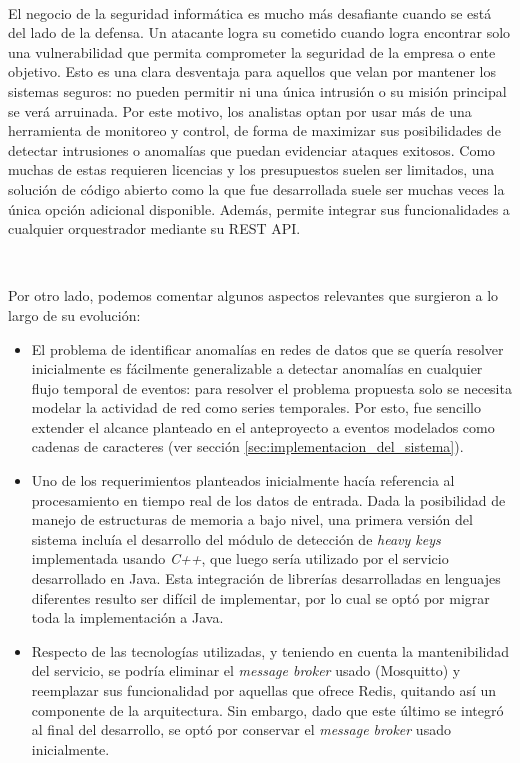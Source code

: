 \documentclass[a4paper,12pt, oneside]{article}
\begin{document}
\

El negocio de la seguridad informática es mucho más desafiante cuando se está del lado de la defensa. Un atacante logra su cometido cuando logra encontrar solo una vulnerabilidad que permita comprometer la seguridad de la empresa o ente objetivo. Esto es una clara desventaja para aquellos que velan por mantener los sistemas seguros: no pueden permitir ni una única intrusión o su misión principal se verá arruinada. Por este motivo, los analistas optan por usar más de una herramienta de monitoreo y control, de forma de maximizar sus posibilidades de detectar intrusiones o anomalías que puedan evidenciar ataques exitosos. Como muchas de estas requieren licencias y los presupuestos suelen ser limitados, una solución de código abierto como la que fue desarrollada suele ser muchas veces la única opción adicional disponible. Además, permite integrar sus funcionalidades a cualquier orquestrador mediante su REST API.

\

Por otro lado, podemos comentar algunos aspectos relevantes que surgieron a lo largo de su evolución:

\begin{itemize}
	\item El problema de identificar anomalías en redes de datos que se quería resolver inicialmente es fácilmente generalizable a detectar anomalías en cualquier flujo temporal de eventos: para resolver el problema propuesta solo se necesita modelar la actividad de red como series temporales. Por esto, fue sencillo extender el alcance planteado en el anteproyecto a eventos modelados como cadenas de caracteres (ver sección \ref{sec:implementacion_del_sistema}).
	\item Uno de los requerimientos planteados inicialmente hacía referencia al procesamiento en tiempo real de los datos de entrada. Dada la posibilidad de manejo de estructuras de memoria a bajo nivel, una primera versión del sistema incluía el desarrollo del módulo de detección de \textit{heavy keys} implementada usando \textit{C++}, que luego sería utilizado por el servicio desarrollado en Java. Esta integración de librerías desarrolladas en lenguajes diferentes resulto ser difícil de implementar, por lo cual se optó por migrar toda la implementación a Java.
	\item Respecto de las tecnologías utilizadas, y teniendo en cuenta la mantenibilidad del servicio, se podría eliminar el \textit{message broker} usado (Mosquitto) y reemplazar sus funcionalidad por aquellas que ofrece Redis, quitando así un componente de la arquitectura. Sin embargo, dado que este último se integró al final del desarrollo, se optó por conservar el \textit{message broker} usado inicialmente.
\end{itemize}
\end{document}
